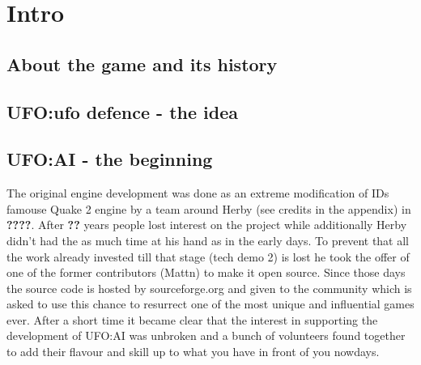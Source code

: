 
%
%


\section{Intro}

\subsection{About the game and its history}

\subsection{UFO:ufo defence - the idea}

\subsection{UFO:AI - the beginning}
The original engine development was done as an extreme modification of IDs famouse Quake 2 engine by a team around Herby (see credits in the appendix) in \textbf{????}. After \textbf{??} years people lost interest on the project while additionally Herby didn't had the as much time at his hand as in the early days.
To prevent that all the work already invested till that stage (tech demo 2) is lost he took the offer of one of the former contributors (Mattn) to make it open source.  Since those days the source code is hosted by sourceforge.org and given to the community which is asked to use this chance to resurrect one of the most unique and influential games ever. After a short time it became clear that the interest in supporting the development of UFO:AI was unbroken and a bunch of volunteers found together to add their flavour and skill up to what you have in front of you nowdays.

